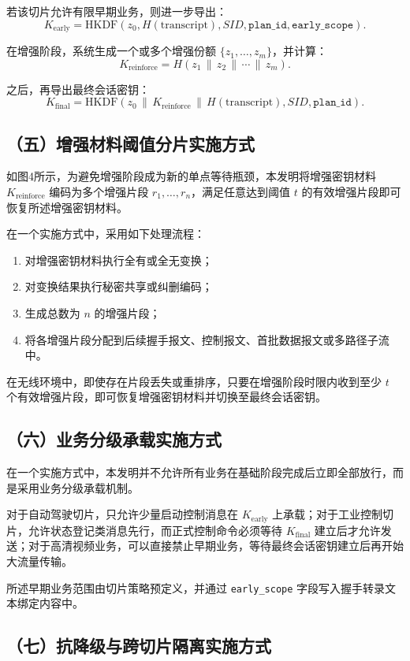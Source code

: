 \documentclass[12pt,a4paper]{article}
\newcommand{\Kearly}{K_{\mathrm{early}}}
\newcommand{\Kfinal}{K_{\mathrm{final}}}
\newcommand{\Krein}{K_{\mathrm{reinforce}}}
\begin{document}
若该切片允许有限早期业务，则进一步导出：
\[
\Kearly=\mathrm{HKDF}(z_0, H(\mathrm{transcript}), SID, \texttt{plan\_id}, \texttt{early\_scope}).
\]

在增强阶段，系统生成一个或多个增强份额 $\{z_1,\dots,z_m\}$，并计算：
\[
\Krein = H(z_1 \,\|\, z_2 \,\|\, \cdots \,\|\, z_m).
\]

之后，再导出最终会话密钥：
\[
\Kfinal=\mathrm{HKDF}(z_0 \,\|\, \Krein \,\|\, H(\mathrm{transcript}), SID, \texttt{plan\_id}).
\]

\subsection*{（五）增强材料阈值分片实施方式}

如图4所示，为避免增强阶段成为新的单点等待瓶颈，本发明将增强密钥材料 $\Krein$ 编码为多个增强片段 $r_1,\dots,r_n$，满足任意达到阈值 $t$ 的有效增强片段即可恢复所述增强密钥材料。

在一个实施方式中，采用如下处理流程：

\begin{enumerate}[leftmargin=2em]
    \item 对增强密钥材料执行全有或全无变换；
    \item 对变换结果执行秘密共享或纠删编码；
    \item 生成总数为 $n$ 的增强片段；
    \item 将各增强片段分配到后续握手报文、控制报文、首批数据报文或多路径子流中。
\end{enumerate}

在无线环境中，即使存在片段丢失或重排序，只要在增强阶段时限内收到至少 $t$ 个有效增强片段，即可恢复增强密钥材料并切换至最终会话密钥。

\subsection*{（六）业务分级承载实施方式}

在一个实施方式中，本发明并不允许所有业务在基础阶段完成后立即全部放行，而是采用业务分级承载机制。

对于自动驾驶切片，只允许少量启动控制消息在 $\Kearly$ 上承载；对于工业控制切片，允许状态登记类消息先行，而正式控制命令必须等待 $\Kfinal$ 建立后才允许发送；对于高清视频业务，可以直接禁止早期业务，等待最终会话密钥建立后再开始大流量传输。

所述早期业务范围由切片策略预定义，并通过 \texttt{early\_scope} 字段写入握手转录文本绑定内容中。

\subsection*{（七）抗降级与跨切片隔离实施方式}
\end{document}
